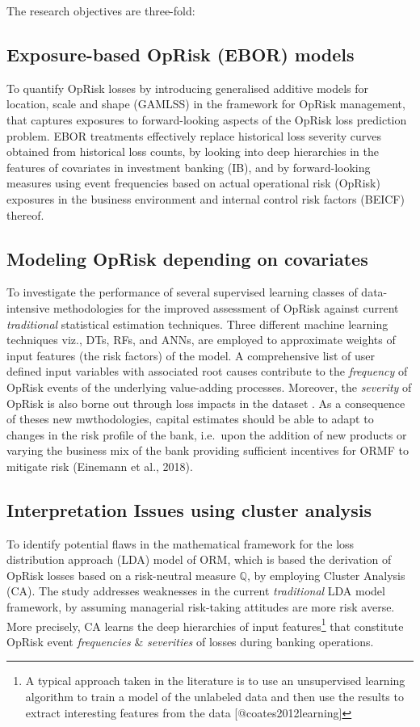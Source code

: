 \documentclass{DissertateUSU}
\begin{document}
The research objectives are three-fold:

\subsection{Exposure-based OpRisk (EBOR) models}

To quantify OpRisk losses by introducing generalised additive models for
location, scale and shape (GAMLSS) in the framework for OpRisk
management, that captures exposures to forward-looking aspects of the
OpRisk loss prediction problem. EBOR treatments effectively replace
historical loss severity curves obtained from historical loss counts, by
looking into deep hierarchies in the features of covariates in
investment banking (IB), and by forward-looking measures using event
frequencies based on actual operational risk (OpRisk) exposures in the
business environment and internal control risk factors (BEICF) thereof.

\subsection{Modeling OpRisk depending on covariates}

To investigate the performance of several supervised learning classes of
data-intensive methodologies for the improved assessment of OpRisk
against current \emph{traditional} statistical estimation techniques.
Three different machine learning techniques viz., DTs, RFs, and ANNs,
are employed to approximate weights of input features (the risk factors)
of the model. A comprehensive list of user defined input variables with
associated root causes contribute to the \emph{frequency} of OpRisk
events of the underlying value-adding processes. Moreover, the
\emph{severity} of OpRisk is also borne out through loss impacts in the
dataset . As a consequence of theses new mwthodologies, capital
estimates should be able to adapt to changes in the risk profile of the
bank, i.e.~upon the addition of new products or varying the business mix
of the bank providing sufficient incentives for ORMF to mitigate risk
(Einemann et al., 2018).

\subsection{Interpretation Issues using cluster analysis}

To identify potential flaws in the mathematical framework for the loss
distribution approach (LDA) model of ORM, which is based the derivation
of OpRisk losses based on a risk-neutral measure \(\mathbb{Q}\), by
employing Cluster Analysis (CA). The study addresses weaknesses in the
current \emph{traditional} LDA model framework, by assuming managerial
risk-taking attitudes are more risk averse. More precisely, CA learns
the deep hierarchies of input
features\footnote{A typical approach taken in the literature is to use an unsupervised learning algorithm to train a model of the unlabeled data and then use the results to extract interesting features from the data [@coates2012learning]}
that constitute OpRisk event \emph{frequencies} \& \emph{severities} of
losses during banking operations.\medskip
\end{document}
